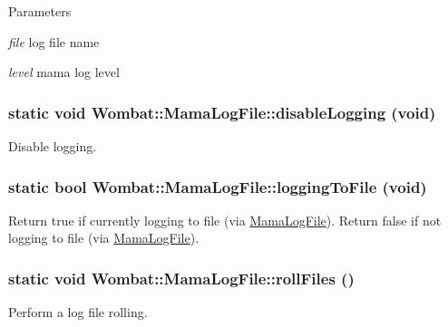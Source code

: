 \begin{DoxyParams}{Parameters}
\item[{\em file}]log file name \item[{\em level}]mama log level \end{DoxyParams}
\hypertarget{classWombat_1_1MamaLogFile_afe285fd3230d67b3e565f4cafadfcf2b}{
\subsubsection[{disableLogging}]{\setlength{\rightskip}{0pt plus 5cm}static void Wombat::MamaLogFile::disableLogging (void)}}
\label{classWombat_1_1MamaLogFile_afe285fd3230d67b3e565f4cafadfcf2b}


Disable logging. \hypertarget{classWombat_1_1MamaLogFile_a476c7a71ac0223dabc9a02928a46b657}{
\subsubsection[{loggingToFile}]{\setlength{\rightskip}{0pt plus 5cm}static bool Wombat::MamaLogFile::loggingToFile (void)}}
\label{classWombat_1_1MamaLogFile_a476c7a71ac0223dabc9a02928a46b657}


Return true if currently logging to file (via \hyperlink{classWombat_1_1MamaLogFile}{MamaLogFile}). Return false if not logging to file (via \hyperlink{classWombat_1_1MamaLogFile}{MamaLogFile}). \hypertarget{classWombat_1_1MamaLogFile_a00b206009ede2cff176b3fd9647e362b}{
\subsubsection[{rollFiles}]{\setlength{\rightskip}{0pt plus 5cm}static void Wombat::MamaLogFile::rollFiles ()}}
\label{classWombat_1_1MamaLogFile_a00b206009ede2cff176b3fd9647e362b}


Perform a log file rolling. 